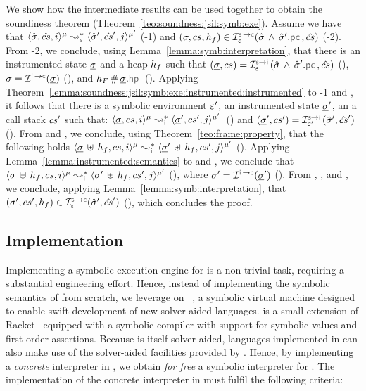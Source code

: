We show how the intermediate results can be used together to 
obtain the soundiness theorem (Theorem~\ref{teo:soundness:jsil:symb:exe}). 
Assume we have that 
$\transabssemrule{\sstate, \scs, i}{\sstate', \scs', j}{\mode}{\mode'}{\symbolic}$ (\hyp{1}) and 
 $(\jstate, \cs, \heap_f) \in \interpret{\symbconc}{\senv}(\sstate \, \wedge \, \sstate'.\pcsel, \scs)$ (\hyp{2}).  
 From \hyp{2}, we conclude, using Lemma~\ref{lemma:symb:interpretation}, that there is an 
 instrumented state $\underline{\sigma}$ and a heap $h_f$ such that $(\istate, \cs) = \interpret{\symbinst}{\senv}(\sstate  \, \wedge \, \sstate'.\pcsel, \scs)$ (), 
 $\jstate = \interpret{\instconc}{}(\istate)$ (), and $h_F \disjoint \istate.\hpsel$ (). 
 Applying Theorem~\ref{lemma:soundness:jsil:symb:exe:instrumented:instrumented} to \hyp{1} 
 and , it follows that there is a symbolic environment $\varepsilon'$, an instrumented state $\underline{\sigma}'$, 
 an a call stack $cs'$ such that: 
$\transabssemrule{\istate, \cs, i}{\istate', \cs', j}{\mode}{\mode'}{\instrumented}$~()
and $(\istate', \cs') = \interpret{\symbinst}{\senv'}(\sstate', \scs')$ ().
From  and , we conclude, using Theorem~\ref{teo:frame:property}, that the following 
holds $\transabssemrule{\istate \dunion \heap_f, \cs, i}{\istate' \dunion \heap_f, \cs', j}{\mode}{\mode'}{\instrumented}$ (). 
Applying Lemma~\ref{lemma:instrumented:semantics} to  and , we conclude that 
 $\transabssemrule{\jstate \dunion \heap_f, \cs, i}{\jstate' \dunion \heap_f, \cs', j}{\mode}{\mode'}{\instrumented}$ (), 
 where $\jstate' = \interpret{\instconc}{}(\istate')$ ().
 From , , and , we conclude, applying Lemma~\ref{lemma:symb:interpretation}, 
 that $(\jstate', \cs', \heap_f) \in \interpret{\symbconc}{\senv}(\sstate', \scs')$ (), 
 which concludes the proof. 

\subsection{Implementation}\label{subsec:jsil:analysis:implementation}


Implementing a symbolic execution engine for \jsil is a non-trivial 
task, requiring a substantial engineering effort. 
% 
% 
Hence, instead of implementing the symbolic semantics of \jsil from scratch, we leverage on 
\rosette~\cite{Rosette1,Rosette2}, a symbolic virtual machine designed to 
enable swift development of new 
solver-aided languages. 
%
\rosette is a small extension of Racket~\cite{racket} equipped with a symbolic compiler with support 
for symbolic values and first order assertions. Because \rosette is itself solver-aided, languages 
implemented in \rosette can also make use of the solver-aided facilities provided by \rosette. 
Hence, by implementing a \emph{concrete} \jsil interpreter in \rosette, we obtain \emph{for free} a symbolic 
interpreter for \jsil. %
%
The implementation of the concrete interpreter in \rosette must fulfil the following criteria:

